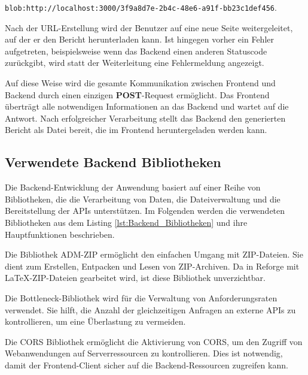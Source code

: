 \texttt{blob:http://localhost:3000/3f9a8d7e-2b4c-48e6-a91f-bb23c1def456}. 

Nach der \ac{URL}-Erstellung wird der Benutzer auf eine neue Seite weitergeleitet, auf der er den Bericht herunterladen kann. Ist hingegen vorher ein Fehler aufgetreten, beispielsweise wenn das Backend einen anderen Statuscode zurückgibt, wird statt der Weiterleitung eine Fehlermeldung angezeigt.

Auf diese Weise wird die gesamte Kommunikation zwischen Frontend und Backend durch einen einzigen \textbf{POST}-Request ermöglicht. Das Frontend überträgt alle notwendigen Informationen an das Backend und wartet auf die Antwort. Nach erfolgreicher Verarbeitung stellt das Backend den generierten Bericht als Datei bereit, die im Frontend heruntergeladen werden kann. 

\subsection{Verwendete Backend Bibliotheken}
Die Backend-Entwicklung der Anwendung basiert auf einer Reihe von Bibliotheken, die die Verarbeitung von Daten, die Dateiverwaltung und die Bereitstellung der \ac{API}s unterstützen. Im Folgenden werden die verwendeten Bibliotheken aus dem Listing \ref{lst:Backend_Bibliotheken} und ihre Hauptfunktionen beschrieben.


Die Bibliothek ADM-ZIP ermöglicht den einfachen Umgang mit ZIP-Dateien. Sie dient zum Erstellen, Entpacken und Lesen von ZIP-Archiven. Da in Reforge mit LaTeX-ZIP-Dateien gearbeitet wird, ist diese Bibliothek unverzichtbar.

Die Bottleneck-Bibliothek wird für die Verwaltung von Anforderungsraten verwendet. Sie hilft, die Anzahl der gleichzeitigen Anfragen an externe \ac{API}s zu kontrollieren, um eine Überlastung zu vermeiden.

Die CORS Bibliothek ermöglicht die Aktivierung von \ac{CORS}, um den Zugriff von Webanwendungen auf Serverressourcen zu kontrollieren. Dies ist notwendig, damit der Frontend-Client sicher auf die Backend-Ressourcen zugreifen kann.

